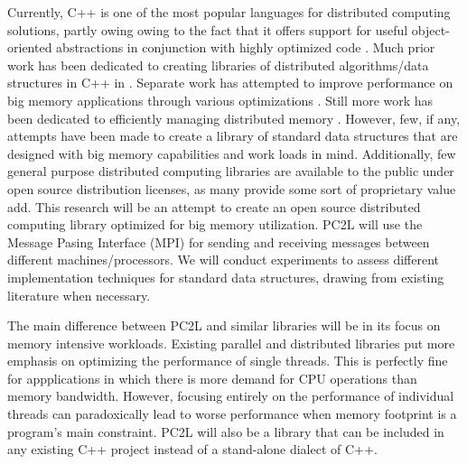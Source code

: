 Currently, C++ is one of the most popular languages for distributed computing solutions, partly owing owing to the fact that it offers support for useful object-oriented abstractions in conjunction with highly optimized code \cite{towards_dist_cpp}. Much prior work has been dedicated to creating libraries of distributed algorithms/data structures in C++ in \cite{STAPL}  \cite{practical_dist_c}
\cite{taskflow} \cite{intel_tbb} \cite{parallel_programming_w_charm} \cite{chapel} \cite{X10}. Separate work has attempted to improve performance on big memory applications through various optimizations \cite{virtual_memory_tlb}. Still more work has been dedicated to efficiently managing distributed memory \cite{spark} \cite{zookeeper} \cite{memcached} \cite{GAM}. However, few, if any, attempts have been made to create a library of standard data structures that are designed with big memory capabilities and work loads in mind. Additionally, few general purpose distributed computing libraries are available to the public under open source distribution licenses, as many provide some sort of proprietary value add. This research will be an attempt to create an open source distributed computing library optimized for big memory utilization. PC2L will use the Message Pasing Interface (MPI) for sending and receiving messages between different machines/processors. We will conduct experiments to assess different implementation techniques for standard data structures, drawing from existing literature when necessary. 

The main difference between PC2L and similar libraries will be in its focus on memory intensive workloads. Existing parallel and distributed libraries put more emphasis on optimizing the performance of single threads. This is perfectly fine for appplications in which there is more demand for CPU operations than memory bandwidth. However, focusing entirely on the performance of individual threads can paradoxically lead to worse performance when memory footprint is a program's main constraint. PC2L will also be a library that can be included in any existing C++ project instead of a stand-alone dialect of C++.    
